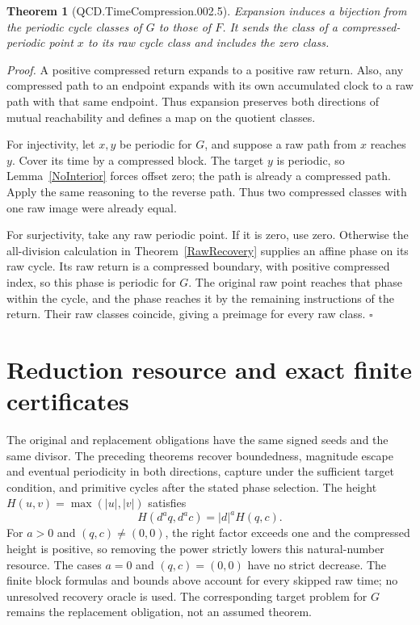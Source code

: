 \documentclass[11pt,letterpaper]{article}
\newtheorem{theorem}{Theorem}
\newenvironment{proof}{\noindent\textit{Proof.}}{\hfill\(\square\)}
\begin{document}
\begin{theorem}[QCD.TimeCompression.002.5]\label{CycleClasses}
Expansion induces a bijection from the periodic cycle classes of \(G\) to
those of \(F\). It sends the class of a compressed-periodic point \(x\) to
its raw cycle class and includes the zero class.
\end{theorem}
\begin{proof}
A positive compressed return expands to a positive raw return. Also, any
compressed path to an endpoint expands with its own accumulated clock to a
raw path with that same endpoint. Thus expansion preserves both directions
of mutual reachability and defines a map on the quotient classes.

For injectivity, let \(x,y\) be periodic for \(G\), and suppose a raw path
from \(x\) reaches \(y\). Cover its time by a compressed block. The target
\(y\) is periodic, so Lemma~\ref{NoInterior} forces offset zero; the path is
already a compressed path. Apply the same reasoning to the reverse path.
Thus two compressed classes with one raw image were already equal.

For surjectivity, take any raw periodic point. If it is zero, use zero.
Otherwise the all-division calculation in Theorem~\ref{RawRecovery} supplies
an affine phase on its raw cycle. Its raw return is a compressed boundary,
with positive compressed index, so this phase is periodic for \(G\).
The original raw point reaches that phase within the cycle, and the phase
reaches it by the remaining instructions of the return. Their raw classes
coincide, giving a preimage for every raw class.
\end{proof}

\section{Reduction resource and exact finite certificates}

The original and replacement obligations have the same signed seeds and the
same divisor. The preceding theorems recover boundedness, magnitude escape and
eventual periodicity in both directions, capture under the sufficient target
condition, and primitive cycles after the stated phase selection. The height
\(H(u,v)=\max(|u|,|v|)\) satisfies
\[
H(d^a q,d^a c)=|d|^aH(q,c).
\]
For \(a>0\) and \((q,c)\ne(0,0)\), the right factor exceeds one and the
compressed height is positive, so removing the power strictly lowers this
natural-number resource. The cases \(a=0\) and \((q,c)=(0,0)\) have no strict
decrease. The finite block formulas and bounds above account for every skipped
raw time; no unresolved recovery oracle is used. The corresponding target
problem for \(G\) remains the replacement obligation, not an assumed theorem.
\end{document}
